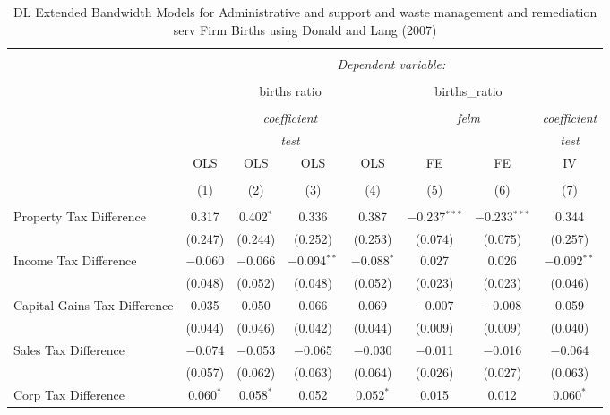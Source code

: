
\begin{table}[!htbp] \centering 
  \caption{DL Extended Bandwidth Models for  Administrative and support and waste management and remediation serv Firm Births using Donald and Lang (2007)} 
  \label{} 
\begin{tabular}{@{\extracolsep{5pt}}lccccccc} 
\\[-1.8ex]\hline 
\hline \\[-1.8ex] 
 & \multicolumn{7}{c}{\textit{Dependent variable:}} \\ 
\cline{2-8} 
\\[-1.8ex] & \multicolumn{4}{c}{births ratio} & \multicolumn{2}{c}{births\_ratio} &   \\ 
\\[-1.8ex] & \multicolumn{4}{c}{\textit{coefficient}} & \multicolumn{2}{c}{\textit{felm}} & \textit{coefficient} \\ 
 & \multicolumn{4}{c}{\textit{test}} & \multicolumn{2}{c}{\textit{}} & \textit{test} \\ 
 & OLS & OLS & OLS & OLS & FE & FE & IV \\ 
\\[-1.8ex] & (1) & (2) & (3) & (4) & (5) & (6) & (7)\\ 
\hline \\[-1.8ex] 
 Property Tax Difference & 0.317 & 0.402$^{*}$ & 0.336 & 0.387 & $-$0.237$^{***}$ & $-$0.233$^{***}$ & 0.344 \\ 
  & (0.247) & (0.244) & (0.252) & (0.253) & (0.074) & (0.075) & (0.257) \\ 
  Income Tax Difference & $-$0.060 & $-$0.066 & $-$0.094$^{**}$ & $-$0.088$^{*}$ & 0.027 & 0.026 & $-$0.092$^{**}$ \\ 
  & (0.048) & (0.052) & (0.048) & (0.052) & (0.023) & (0.023) & (0.046) \\ 
  Capital Gains Tax Difference & 0.035 & 0.050 & 0.066 & 0.069 & $-$0.007 & $-$0.008 & 0.059 \\ 
  & (0.044) & (0.046) & (0.042) & (0.044) & (0.009) & (0.009) & (0.040) \\ 
  Sales Tax Difference & $-$0.074 & $-$0.053 & $-$0.065 & $-$0.030 & $-$0.011 & $-$0.016 & $-$0.064 \\ 
  & (0.057) & (0.062) & (0.063) & (0.064) & (0.026) & (0.027) & (0.063) \\ 
  Corp Tax Difference & 0.060$^{*}$ & 0.058$^{*}$ & 0.052 & 0.052$^{*}$ & 0.015 & 0.012 & 0.060$^{*}$ \\ 

\end{tabular}
\end{table}
